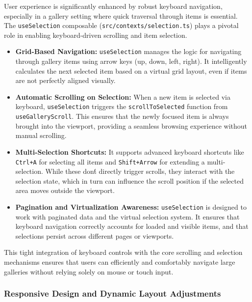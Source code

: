 \documentclass[10pt]{article}
\begin{document}
User experience is significantly enhanced by robust keyboard navigation, especially in a gallery setting where quick traversal through items is essential. The \texttt{useSelection} composable (\texttt{src/contexts/selection.ts}) plays a pivotal role in enabling keyboard-driven scrolling and item selection.
\begin{itemize}
    \item \textbf{Grid-Based Navigation:} \texttt{useSelection} manages the logic for navigating through gallery items using arrow keys (up, down, left, right). It intelligently calculates the next selected item based on a virtual grid layout, even if items are not perfectly aligned visually.
    \item \textbf{Automatic Scrolling on Selection:} When a new item is selected via keyboard, \texttt{useSelection} triggers the \texttt{scrollToSelected} function from \texttt{useGalleryScroll}. This ensures that the newly focused item is always brought into the viewport, providing a seamless browsing experience without manual scrolling.
    \item \textbf{Multi-Selection Shortcuts:} It supports advanced keyboard shortcuts like \texttt{Ctrl+A} for selecting all items and \texttt{Shift+Arrow} for extending a multi-selection. While these don\'t directly trigger scrolls, they interact with the selection state, which in turn can influence the scroll position if the selected area moves outside the viewport.
    \item \textbf{Pagination and Virtualization Awareness:} \texttt{useSelection} is designed to work with paginated data and the virtual selection system. It ensures that keyboard navigation correctly accounts for loaded and visible items, and that selections persist across different pages or viewports.
\end{itemize}
This tight integration of keyboard controls with the core scrolling and selection mechanisms ensures that users can efficiently and comfortably navigate large galleries without relying solely on mouse or touch input.

\subsubsection{Responsive Design and Dynamic Layout Adjustments}
\end{document}
